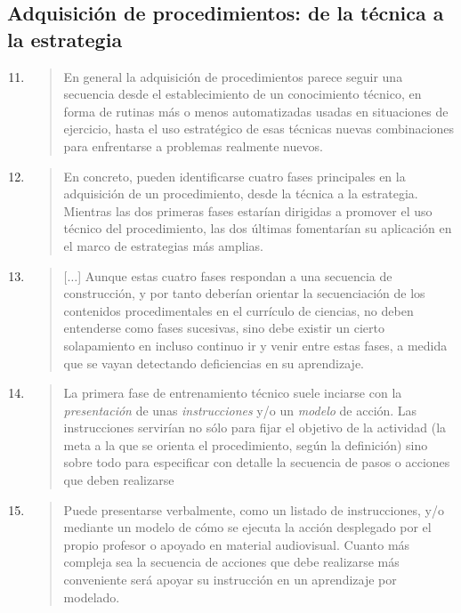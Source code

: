 \documentclass{article}
\begin{document}
\subsection*{Adquisición de procedimientos: de la técnica a la estrategia}

\begin{enumerate}
  \setcounter{enumi}{10}

  \item \begin{quote}
  En general la adquisición de procedimientos parece seguir una secuencia desde el establecimiento de un conocimiento técnico, en forma de rutinas más o menos automatizadas usadas en situaciones de ejercicio, hasta el uso estratégico de esas técnicas nuevas combinaciones para enfrentarse a problemas realmente nuevos.
  \end{quote}

  \item \begin{quote}
  En concreto, pueden identificarse cuatro fases principales en la adquisición de un procedimiento, desde la técnica a la estrategia. Mientras las dos primeras fases estarían dirigidas a promover el uso técnico del procedimiento, las dos últimas fomentarían su aplicación en el marco de estrategias más amplias.  
  \end{quote}

  \item \begin{quote}
[$\ldots$] Aunque estas cuatro fases respondan a una secuencia de construcción, y por tanto deberían orientar la secuenciación de los contenidos procedimentales en el currículo de ciencias, no deben entenderse como fases sucesivas, sino debe existir un cierto solapamiento en incluso continuo ir y venir entre estas fases, a medida que se vayan detectando deficiencias en su aprendizaje. 
  \end{quote}

  \item \begin{quote}
  La primera fase de entrenamiento técnico suele inciarse con la \textit{presentación} de unas \textit{instrucciones} y/o un \textit{modelo} de acción. Las instrucciones servirían no sólo para fijar el objetivo de la actividad (la meta a la que se orienta el procedimiento, según la definición) sino sobre todo para especificar con detalle la secuencia de pasos o acciones que deben realizarse  
  \end{quote}

  \item \begin{quote}
  Puede presentarse verbalmente, como un listado de instrucciones, y/o mediante un modelo de cómo se ejecuta la acción desplegado por el propio profesor o apoyado en material audiovisual. Cuanto más compleja sea la secuencia de acciones que debe realizarse más conveniente será apoyar su instrucción en un aprendizaje por modelado. 
  \end{quote}

\end{enumerate}
\end{document}
